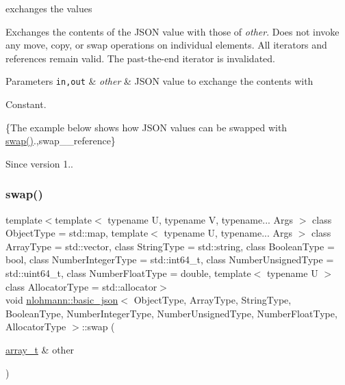 exchanges the values 

Exchanges the contents of the J\+S\+ON value with those of {\itshape other}. Does not invoke any move, copy, or swap operations on individual elements. All iterators and references remain valid. The past-\/the-\/end iterator is invalidated.


\begin{DoxyParams}[1]{Parameters}
\mbox{\tt in,out}  & {\em other} & J\+S\+ON value to exchange the contents with\\
\hline
\end{DoxyParams}
Constant.

\{The example below shows how J\+S\+ON values can be swapped with {\ttfamily \hyperlink{classnlohmann_1_1basic__json_a2f774129440c427253dc97406e2d9010}{swap()}}.,swap\+\_\+\+\_\+reference\}

\begin{DoxySince}{Since}
version 1.. 
\end{DoxySince}
\hypertarget{classnlohmann_1_1basic__json_a8209621de6184d9eabe136b7c8f61935}{}\label{classnlohmann_1_1basic__json_a8209621de6184d9eabe136b7c8f61935} 
\subsubsection{\texorpdfstring{swap()}{swap()}\hspace{0.1cm}{\footnotesize\ttfamily [2/4]}}
{\footnotesize\ttfamily template$<$template$<$ typename U, typename V, typename... Args $>$ class Object\+Type = std\+::map, template$<$ typename U, typename... Args $>$ class Array\+Type = std\+::vector, class String\+Type  = std\+::string, class Boolean\+Type  = bool, class Number\+Integer\+Type  = std\+::int64\+\_\+t, class Number\+Unsigned\+Type  = std\+::uint64\+\_\+t, class Number\+Float\+Type  = double, template$<$ typename U $>$ class Allocator\+Type = std\+::allocator$>$ \\
void \hyperlink{classnlohmann_1_1basic__json}{nlohmann\+::basic\+\_\+json}$<$ Object\+Type, Array\+Type, String\+Type, Boolean\+Type, Number\+Integer\+Type, Number\+Unsigned\+Type, Number\+Float\+Type, Allocator\+Type $>$\+::swap (\begin{DoxyParamCaption}\item[{\hyperlink{classnlohmann_1_1basic__json_ab00b882d39306d663c23dab110f5cae0}{array\+\_\+t} \&}]{other }\end{DoxyParamCaption})\hspace{0.3cm}{\ttfamily [inline]}}



